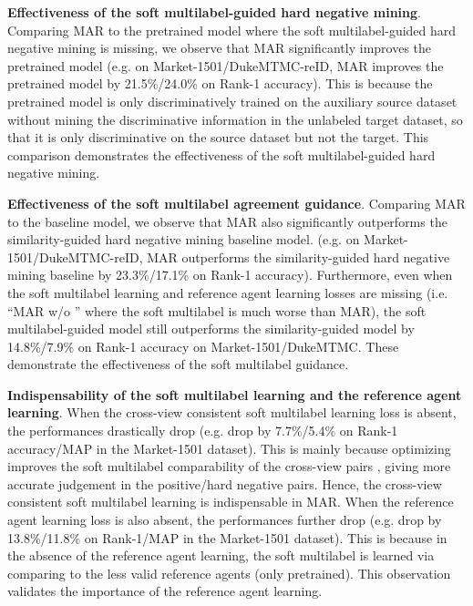 \documentclass[10pt,twocolumn,letterpaper]{article}
\newcommand{\Koven}{\color{black}}
\newcommand{\jason}[1]{{\color{black}#1}}
\begin{document}
\vspace{0.1cm}
\noindent
\textbf{Effectiveness of the soft multilabel-guided hard negative mining}.
Comparing MAR to the pretrained model where the soft multilabel-guided hard negative mining is missing,
we observe that MAR significantly improves the pretrained model
(e.g. \jason{on} Market-1501/DukeMTMC-reID, MAR improves the pretrained model by 21.5\%/24.0\% \jason{on} Rank-1 accuracy).
{\Koven This is because the pretrained model is only discriminatively trained on the auxiliary source dataset without mining the discriminative information in the unlabeled target dataset, so that it is only discriminative on the source dataset but not the target.}
This comparison demonstrates the effectiveness of the soft multilabel-guided hard negative mining.

\vspace{0.1cm}
\noindent
\textbf{Effectiveness of the soft multilabel agreement guidance}.
Comparing MAR to the baseline model,
we observe that MAR also significantly outperforms the similarity-guided hard negative mining baseline model.
(e.g. \jason{on} Market-1501/DukeMTMC-reID, MAR outperforms the similarity-guided hard negative mining baseline by 23.3\%/17.1\% \jason{on} Rank-1 accuracy).
Furthermore, even when the soft multilabel learning and reference agent learning losses are missing
(i.e. ``MAR w/o '' where the soft multilabel is much worse than MAR),
the soft multilabel-guided model still outperforms the similarity-guided model by 14.8\%/7.9\% \jason{on} Rank-1 accuracy \jason{on} Market-1501/DukeMTMC.
These demonstrate the effectiveness of the soft multilabel guidance.

\vspace{0.1cm}
\noindent
\textbf{Indispensability of the soft multilabel learning and the reference agent learning}.
When the cross-view consistent soft multilabel learning loss is absent,
the performances drastically drop
(e.g. drop by 7.7\%/5.4\% \jason{on R}ank-1 accuracy/MAP in the Market-1501 dataset).
This is mainly because optimizing  improves the soft multilabel comparability of the cross-view pairs \cite{2017_ICCV_asymmetric},
giving more accurate judgement in the positive/hard negative pairs.
Hence, the cross-view consistent soft multilabel learning is indispensable in MAR.
When the reference agent learning loss is also absent,
the performances further drop (e.g. drop by 13.8\%/11.8\% \jason{on R}ank-1/MAP in the Market-1501 dataset).
This is because in the absence of the reference agent learning,
the soft multilabel is {\Koven learned via comparing to the less valid reference agents (only pretrained).}
This observation validates the importance of the reference agent learning.
\end{document}
